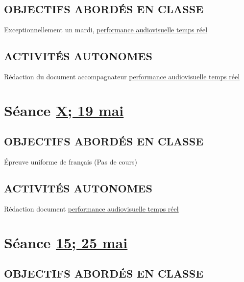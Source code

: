\documentclass[
  french,
]{book}
\begin{document}
\hypertarget{objectifs-aborduxe9s-en-classe-15}{%
\subsection{OBJECTIFS ABORDÉS EN CLASSE}\label{objectifs-aborduxe9s-en-classe-15}}

Exceptionnellement un mardi,
\protect\hyperlink{sommatif_5}{performance audiovisuelle temps réel}

\hypertarget{activituxe9s-autonomes-15}{%
\subsection{ACTIVITÉS AUTONOMES}\label{activituxe9s-autonomes-15}}

Rédaction du document accompagnateur \protect\hyperlink{sommatif_5}{performance audiovisuelle temps réel}

\hypertarget{semaine_17}{%
\section{\texorpdfstring{Séance \protect\hyperlink{semaine_17}{X; 19 mai}}{Séance X; 19 mai}}\label{semaine_17}}

\hypertarget{objectifs-aborduxe9s-en-classe-16}{%
\subsection{OBJECTIFS ABORDÉS EN CLASSE}\label{objectifs-aborduxe9s-en-classe-16}}

Épreuve uniforme de français (Pas de cours)

\hypertarget{activituxe9s-autonomes-16}{%
\subsection{ACTIVITÉS AUTONOMES}\label{activituxe9s-autonomes-16}}

Rédaction document \protect\hyperlink{sommatif_5}{performance audiovisuelle temps réel}

\hypertarget{semaine_18}{%
\section{\texorpdfstring{Séance \protect\hyperlink{semaine_18}{15; 25 mai}}{Séance 15; 25 mai}}\label{semaine_18}}

\hypertarget{objectifs-aborduxe9s-en-classe-17}{%
\subsection{OBJECTIFS ABORDÉS EN CLASSE}\label{objectifs-aborduxe9s-en-classe-17}}
\end{document}
